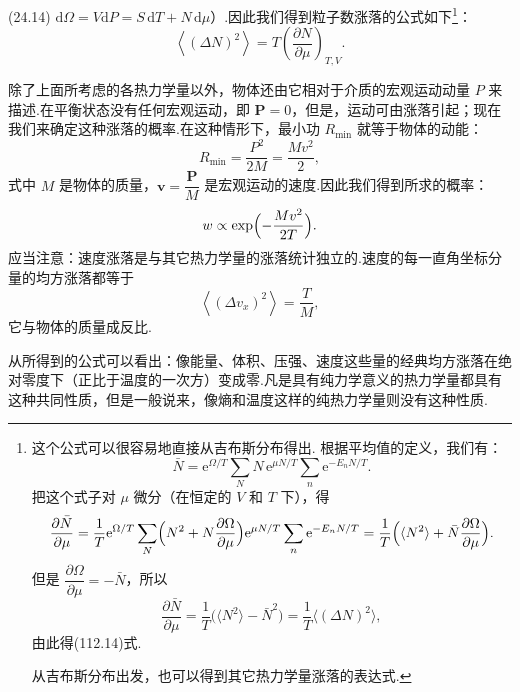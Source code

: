 (24.14) $\mathrm{d}\Omega=V\mathrm{d}P=S\,\mathrm{d}T+N\,\mathrm{d}\mu$）.因此我们得到粒子数涨落的公式如下\footnote{这个公式可以很容易地直接从吉布斯分布得出. 根据平均值的定义，我们有：
\begin{equation*}
  \bar{N}=\mathrm{e}^{\Omega/T}\sum_{N}N\,\mathrm{e}^{\mu N/T}
  \sum_{n}\mathrm{e}^{-E_{n}N/T}.
\end{equation*}
把这个式子对 $\mu$ 微分（在恒定的 $V$ 和 $T$ 下），得
\begin{equation*}
  \frac{\partial\bar{N}}{\partial\mu}
  =\frac{1}{T}\mathrm{e}^{\Omega/T}\sum_{N}
  \Bigl(N^{2}+N\frac{\partial\Omega}{\partial\mu}\Bigr)
  \mathrm{e}^{\mu N/T}\sum_{n}\mathrm{e}^{-E_{n}N/T}
  =\frac{1}{T}\Bigl(\langle N^{2}\rangle
  +\bar{N}\frac{\partial\Omega}{\partial\mu}\Bigr).
\end{equation*}
但是 $\dfrac{\partial\Omega}{\partial\mu}=-\bar{N}$，所以
\begin{equation*}
  \frac{\partial\bar{N}}{\partial\mu}
  =\frac{1}{T}\bigl(\langle N^{2}\rangle-\bar{N}^{2}\bigr)
  =\frac{1}{T}\bigl\langle(\Delta N)^{2}\bigr\rangle,
\end{equation*}
由此得(112.14)式.\par
从吉布斯分布出发，也可以得到其它热力学量涨落的表达式.}：
\begin{equation}
  \left\langle(\Delta N)^{2}\right\rangle
  =T\left(\frac{\partial N}{\partial\mu}\right)_{T,V}.
\end{equation}

除了上面所考虑的各热力学量以外，物体还由它相对于介质的宏观运动动量 $P$ 来描述.在平衡状态没有任何宏观运动，即 $\boldsymbol{P}=0$，但是，运动可由涨落引起；现在我们来确定这种涨落的概率.在这种情形下，最小功 $R_{\min}$ 就等于物体的动能：
\begin{equation*}
  R_{\min}=\frac{P^{2}}{2M}=\frac{Mv^{2}}{2},
\end{equation*}
式中 $M$ 是物体的质量，$\boldsymbol{v}=\dfrac{\boldsymbol{P}}{M}$ 是宏观运动的速度.因此我们得到所求的概率：
\begin{equation}
  w\propto\exp\Bigl(-\frac{Mv^{2}}{2T}\Bigr).
\end{equation}
应当注意：速度涨落是与其它热力学量的涨落统计独立的.速度的每一直角坐标分量的均方涨落都等于
\begin{equation}
  \left\langle(\Delta v_{x})^{2}\right\rangle=\frac{T}{M},
\end{equation}
它与物体的质量成反比.

从所得到的公式可以看出：像能量、体积、压强、速度这些量的经典均方涨落在绝对零度下（正比于温度的一次方）变成零.凡是具有纯力学意义的热力学量都具有这种共同性质，但是一般说来，像熵和温度这样的纯热力学量则没有这种性质.

